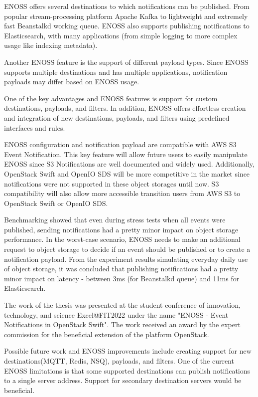     ENOSS offers several destinations to which notifications can be published. From popular stream-processing platform Apache Kafka to lightweight and extremely fast Beanstalkd working queue. ENOSS also supports publishing notifications to Elasticsearch, with many applications (from simple logging to more complex usage like indexing metadata).

    Another ENOSS feature is the support of different payload types. Since ENOSS supports multiple destinations and has multiple applications, notification payloads may differ based on ENOSS usage.

    One of the key advantages and ENOSS features is support for custom destinations, payloads, and filters.
    In addition, ENOSS offers effortless creation and integration of new destinations, payloads, and filters using predefined interfaces and rules.

    ENOSS configuration and notification payload are compatible with AWS S3 Event Notification. This key feature will allow future users to easily manipulate ENOSS since S3 Notifications are well documented and widely used. Additionally, OpenStack Swift and OpenIO SDS will be more competitive in the market since notifications were not supported in these object storages until now. S3 compatibility will also allow more accessible transition users from AWS S3 to OpenStack Swift or OpenIO SDS.

    Benchmarking showed that even during stress tests when all events were published, sending notifications had a pretty minor impact on object storage performance. In the worst-case scenario, ENOSS needs to make an additional request to object storage to decide if an event should be published or to create a notification payload. From the experiment results simulating everyday daily use of object storage, it was concluded that publishing notifications had a pretty minor impact on latency - between 3ms (for Beanstalkd queue) and 11ms for Elasticsearch.

    The work of the thesis was presented at the student conference of innovation, technology, and science Excel@FIT2022 under the name "ENOSS - Event Notifications in OpenStack Swift". The work received an award by the expert commission for the beneficial extension of the platform OpenStack.

    Possible future work and ENOSS improvements include creating support for new destinations(MQTT, Redis, NSQ), payloads, and filters. One of the current ENOSS limitations is that some supported destinations can publish notifications to a single server address. Support for secondary destination servers would be beneficial.


